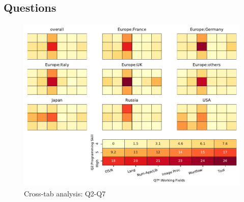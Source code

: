 
\subsection{Questions}


\begin{figure}
\begin{center}
\includegraphics[width=12cm]{../pdfs/Q2-Q7.pdf}
\caption{Cross-tab analysis: Q2-Q7}
\label{fig:Q2-Q7}
\end{center}
\end{figure}
